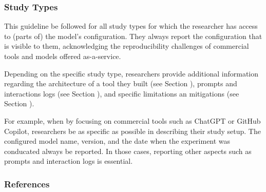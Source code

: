 
\subsubsection{Study Types}

This guideline \must be followed for all study types for which the researcher has access to (parts of) the model's configuration.
They \must always report the configuration that is visible to them, acknowledging the reproducibility challenges of commercial tools and models offered as-a-service. 

Depending on the specific study type, researchers \should provide additional information regarding the architecture of a tool they built (see Section \toolarchitecture), prompts and interactions logs (see Section \prompts), and specific limitations an mitigations (see Section \limitationsmitigations).

For example, when \llmusage by focusing on commercial tools such as ChatGPT or GitHub Copilot, researchers \must be as specific as possible in describing their study setup.
The configured model name, version, and the date when the experiment was conducated \must always be reported.
In those cases, reporting other aspects such as prompts and interaction logs is essential.

\subsubsection{References}






